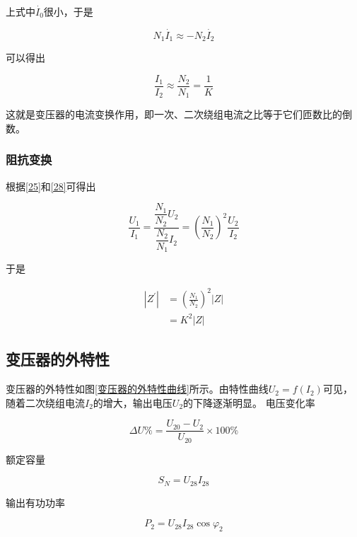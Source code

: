 \documentclass[12pt]{article}
\begin{document}
上式中\(\dot{I_0}\)很小，于是

\begin{equation}
    N_1 \dot{I_1} \approx - N_2 \dot{I_2}
\end{equation}

可以得出

\begin{equation}
    \frac{I_1}{I_2} \approx \frac{N_2}{N_1} = \frac{1}{K}
    \label{28}
\end{equation}

这就是变压器的电流变换作用，即一次、二次绕组电流之比等于它们匝数比的倒数。

\subsubsection{阻抗变换}

根据\ref{25}和\ref{28}可得出

\begin{equation}
    \frac{U_1}{I_1} = \frac{\dfrac{N_1}{N_2}U_2}{\dfrac{N_2}{N_1}I_2} = \left(\frac{N_1}{N_2}\right)^2 \frac{U_2}{I_2}
\end{equation}

于是

\begin{equation}
    \begin{aligned}
        \left|Z^{\prime}\right| & =\left(\frac{N_1}{N_2}\right)^2|Z| \\
        & =K^2|Z|
    \end{aligned}
\end{equation}

\subsection{变压器的外特性}

变压器的外特性如图\ref{变压器的外特性曲线}所示。由特性曲线\(U_2=f(I_2)\)可见，随着二次绕组电流\(I_2\)的增大，输出电压\(U_2\)的下降逐渐明显。
电压变化率

\begin{equation}
\Delta U \%=\frac{U_{20}-U_2}{U_{20}} \times 100 \%
\end{equation}

额定容量

\begin{equation}
    S_N = U_{28} I_{28}
\end{equation}

输出有功功率

\begin{equation}
    P_2 = U_{28} I_{28} \cos \varphi_2
\end{equation}
\end{document}
